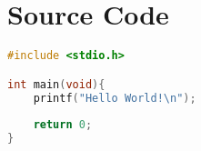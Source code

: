 \chapter{Source Code}
	\begin{lstlisting}[language=C, caption={Ein Beispielhafter Quellcode}]
#include <stdio.h>

int main(void){
	printf("Hello World!\n");
	
	return 0;
}
	\end{lstlisting}